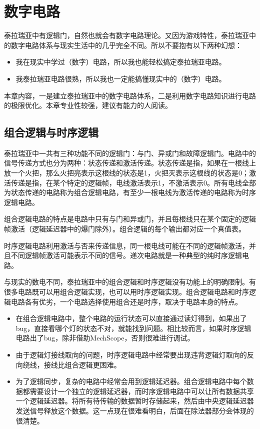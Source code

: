 \chapter{数字电路}\label{chap7}
泰拉瑞亚中有逻辑门，自然也就会有数字电路理论。又因为游戏特性，泰拉瑞亚中的数字电路体系与现实生活中的几乎完全不同。所以不要抱有以下两种幻想：
\begin{itemize}
    \item 我在现实中学过（数字）电路，所以我也能轻松搞定泰拉瑞亚电路。
    \item 我泰拉瑞亚电路很熟，所以我也一定能搞懂现实中的（数字）电路。
\end{itemize}

本章内容，一是建立泰拉瑞亚中的数字电路体系，二是利用数字电路知识进行电路的极限优化。本章专业性较强，建议有能力的人阅读。

\section{组合逻辑与时序逻辑}
泰拉瑞亚中一共有三种功能不同的逻辑门：与门、异或门和故障逻辑门。电路中的信号传递方式也分为两种：状态传递和激活传递。状态传递是指，如果在一根线上放一个火把，那么火把亮表示这根线的状态是1，火把灭表示这根线的状态是0；激活传递是指，在某个特定的逻辑帧，电线激活表示1，不激活表示0。所有电线全部为状态传递的电路称为组合逻辑电路，有至少一根电线为激活传递的电路称为时序逻辑电路。

组合逻辑电路的特点是电路中只有与门和异或门，并且每根线只在某个固定的逻辑帧激活（逻辑延迟器中的爆门除外）。组合逻辑的每个输出都对应一个真值表。

时序逻辑电路利用激活与否来传递信息，同一根电线可能在不同的逻辑帧激活，并且不同逻辑帧激活可能表示不同的信号。递次电路就是一种典型的纯时序逻辑电路。

与现实的数电不同，泰拉瑞亚中的组合逻辑和时序逻辑没有功能上的明确限制。有很多电路既可以用组合逻辑实现，也可以用时序逻辑实现。组合逻辑电路和时序逻辑电路各有优劣，一个电路选择使用组合还是时序，取决于电路本身的特点。
\begin{itemize}
\item 在组合逻辑电路中，整个电路的运行状态可以直接通过读灯得到，如果出了bug，直接看哪个灯的状态不对，就能找到问题。相比较而言，如果时序逻辑电路出了bug，除非借助MechScope，否则很难进行调试。
\item 由于逻辑灯接线取向的问题，时序逻辑电路中经常要出现违背逻辑灯取向的反向绕线，接线比组合逻辑更困难。
\item 为了逻辑同步，复杂的电路中经常会用到逻辑延迟器。组合逻辑电路中每个数据都需要设计一个独立的逻辑延迟器，而时序逻辑电路中可以让所有数据共享一个逻辑延迟器。将所有待传输的数据暂时存储起来，然后由中央逻辑延迟器发送信号释放这个数据。这一点现在很难看明白，后面在除法器部分会体现的很清楚。
\end{itemize}

